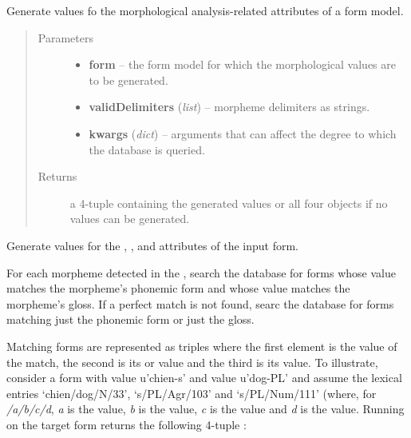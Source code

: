\documentclass[letterpaper,10pt,english]{sphinxmanual}
\begin{document}

\begin{fulllineitems}
\label{api:onlinelinguisticdatabase.controllers.forms.compileMorphemicAnalysis_}
Generate values fo the morphological analysis-related attributes of a form model.
\begin{quote}\begin{description}
\item[{Parameters}] \leavevmode\begin{itemize}
\item {} 
\textbf{form} -- the form model for which the morphological values are to be generated.

\item {} 
\textbf{validDelimiters} (\emph{list}) -- morpheme delimiters as strings.

\item {} 
\textbf{kwargs} (\emph{dict}) -- arguments that can affect the degree to which the database is queried.

\end{itemize}

\item[{Returns}] \leavevmode
a 4-tuple containing the generated values or all four 
objects if no values can be generated.

\end{description}\end{quote}

Generate values for the , ,
 and  attributes of the
input form.

For each morpheme detected in the , search the database for forms
whose  value matches the morpheme's phonemic form and whose
 value matches the morpheme's gloss.  If a perfect match is
not found, searc the database for forms matching just the phonemic form or
just the gloss.

Matching forms are represented as triples where the first element is the
 value of the match, the second is its  or
 value and the third is its 
value.  To illustrate, consider a form with  value
u'chien-s' and  value u'dog-PL' and assume the lexical
entries `chien/dog/N/33', `s/PL/Agr/103' and `s/PL/Num/111' (where, for
\emph{/a/b/c/d}, \emph{a} is the  value, \emph{b} is the 
value, \emph{c} is the  value and \emph{d} is the 
value.  Running  on the target form returns
the following 4-tuple :


\end{fulllineitems}
\end{document}
